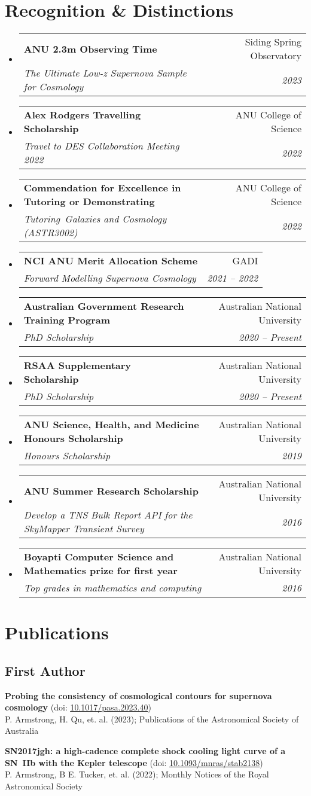 \documentclass[letterpaper,11pt]{article}
\makeatletter
\newcommand*\lbreak{\\[\baselineskip]}
\newcommand{\resumeItem}[1]{
  \item\small{
    {#1 \vspace{-2pt}}
  }
}
\newcommand{\resumeSubheading}[4]{
  \vspace{-2pt}\item
    \begin{tabular*}{0.97\textwidth}[t]{l@{\extracolsep{\fill}}r}
      \textbf{#1} & #2 \\
      \textit{\small#3} & \textit{\small #4} \\
    \end{tabular*}\vspace{-7pt}
}
\newcommand{\resumeSubHeadingListStart}{\begin{itemize}[leftmargin=0.15in, label={}]}
\newcommand{\resumeSubHeadingListEnd}{\end{itemize}}
\newcommand{\resumeItemListStart}{\begin{itemize}}
\newcommand{\resumeItemListEnd}{\end{itemize}\vspace{-5pt}}
\newcommand{\awardElement}[5]{%
    \resumeSubHeadingListStart
        \resumeSubheading
            {#1}
            {#2}
            {#3}
            {#4}
            \ifthenelse{\isempty{#5}}{}{%
                \resumeItemListStart
                    \renewcommand*{\do}[1]{\resumeItem{##1}}
                    \docsvlist{#5}%
                \resumeItemListEnd
            }%
    \resumeSubHeadingListEnd
}
\newcommand{\publicationElement}[5]{%
    \textbf{{#1}} ({#4})\\{#3}; {#2}\lbreak{}
}
\makeatother
\begin{document}
\section{Recognition \& Distinctions}

    \awardElement{ANU 2.3m Observing Time}{Siding Spring Observatory}{The Ultimate Low-z Supernova Sample for Cosmology}{2023}{}

    \awardElement{Alex Rodgers Travelling Scholarship}{ANU College of Science}{Travel to DES Collaboration Meeting 2022}{2022}{}
    
    \awardElement{Commendation for Excellence in Tutoring or Demonstrating}{ANU College of Science}{Tutoring~\textit{Galaxies and Cosmology (ASTR3002)}}{2022}{}

    \awardElement{NCI ANU Merit Allocation Scheme}{GADI}{Forward Modelling Supernova Cosmology}{2021 -- 2022}{}
    
    \awardElement{Australian Government Research Training Program}{Australian National University}{PhD Scholarship}{2020 -- Present}{}
    
    \awardElement{RSAA Supplementary Scholarship}{Australian National University}{PhD Scholarship}{2020 -- Present}{}
    
    \awardElement{ANU Science, Health, and Medicine Honours Scholarship}{Australian National University}{Honours Scholarship}{2019}{}
    
    \awardElement{ANU Summer Research Scholarship}{Australian National University}{Develop a TNS Bulk Report API for the SkyMapper Transient Survey}{2016}{}
    
    \awardElement{Boyapti Computer Science and Mathematics prize for first year}{Australian National University}{Top grades in mathematics and computing}{2016}{}

\section{Publications}

    \subsection{First Author}

        \publicationElement{Probing the consistency of cosmological contours for supernova cosmology}{Publications of the Astronomical Society of Australia}{P. Armstrong, H. Qu, et. al. (2023)}{doi: \href{https://doi.org/10.1017/pasa.2023.40}{\underline{10.1017/pasa.2023.40}}}{}
        \publicationElement{SN2017jgh: a high-cadence complete shock cooling light curve of a SN IIb with the Kepler telescope}{Monthly Notices of the Royal Astronomical Society}{P. Armstrong, B E. Tucker, et. al. (2022)}{doi: \href{https://doi.org/10.1093/mnras/stab2138}{\underline{10.1093/mnras/stab2138}}}{}
\end{document}
